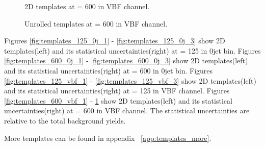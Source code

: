 \begin{figure}[!hbtp]
	
	\centering
	\subfigure[Zjets]{
	\centering
	\label{subfig:template_Zjets_600}
	}

	\centering
	\subfigure[Wgamma]{
	\centering
	\label{subfig:template_Wgamma_600}
	}

	\caption{2D templates at \mHi = 600 \GeV in VBF channel.} 
	\label{fig:templates_600_vbf_3}

\end{figure} 

\begin{figure}[!hbtp]
	
	\centering

	\centering

	\caption{Unrolled templates at \mHi = 600 \GeV in VBF channel.} 
	\label{fig:templates_600_vbf_unroll}

\end{figure} 

Figures \ref{fig:templates_125_0j_1} - \ref{fig:templates_125_0j_3} show 2D templates(left) and 
its statistical uncertainties(right) at \mHi = 125 \GeV in 0jet bin. 
Figures \ref{fig:templates_600_0j_1} - \ref{fig:templates_600_0j_3} show 2D templates(left) and 
its statistical uncertainties(right) at \mHi = 600 \GeV in 0jet bin. 
Figures \ref{fig:templates_125_vbf_1} - \ref{fig:templates_125_vbf_3} show 2D templates(left) and 
its statistical uncertainties(right) at \mHi = 125 \GeV in VBF channel. 
Figures \ref{fig:templates_600_vbf_1} - \ref{fig:templates_600_vbf_3} show 2D templates(left) and 
its statistical uncertainties(right) at \mHi = 600 \GeV in VBF channel. 
The statistical uncertainties are relative to the total background yields. 

More templates can be found in appendix ~\ref{app:templates_more}.
